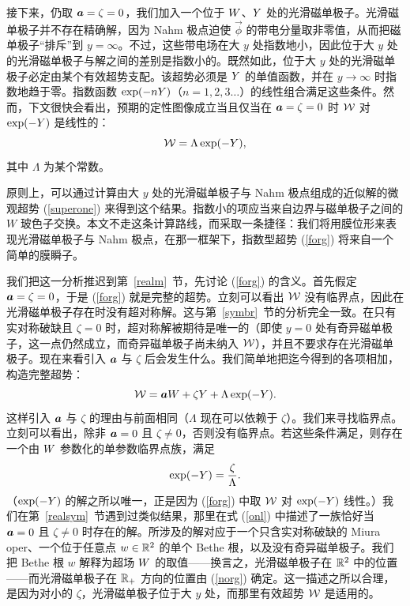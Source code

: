 
接下来，仍取 ${\boldsymbol{a}}=\zeta=0$，我们加入一个位于 ${ W}$、${ Y}$ 处的光滑磁单极子。光滑磁单极子并不存在精确解，因为 Nahm 极点迫使 $\vec\phi$ 的带电分量取非零值，从而把磁单极子“排斥”到 $y=\infty$。不过，这些带电场在大 $y$ 处指数地小，因此位于大 $y$ 处的光滑磁单极子与解之间的差别是指数小的。既然如此，位于大 $y$ 处的光滑磁单极子必定由某个有效超势支配。该超势必须是 ${ Y}$ 的单值函数，并在 $y\to\infty$ 时指数地趋于零。指数函数 $\exp(-n{ Y})$（$n=1,2,3\dots$）的线性组合满足这些条件。然而，下文很快会看出，预期的定性图像成立当且仅当在 ${\boldsymbol{a}}=\zeta=0$ 时 ${\mathcal W}$ 对 $\exp(-{ Y})$ 是线性的：
\begin{equation}\label{forg} {\mathcal W}=\Lambda \exp(-{ Y}),\end{equation}
其中 $\Lambda$ 为某个常数。


原则上，可以通过计算由大 $y$ 处的光滑磁单极子与 Nahm 极点组成的近似解的微观超势 (\ref{superone}) 来得到这个结果。指数小的项应当来自边界与磁单极子之间的 $W$ 玻色子交换。本文不走这条计算路线，而采取一条捷径：我们将用膜位形来表现光滑磁单极子与 Nahm 极点，在那一框架下，指数型超势 (\ref{forg}) 将来自一个简单的膜瞬子。

我们把这一分析推迟到第~\ref{realm}~节，先讨论 (\ref{forg}) 的含义。首先假定 ${\boldsymbol{a}}=\zeta=0$，于是 (\ref{forg}) 就是完整的超势。立刻可以看出 ${\mathcal W}$ 没有临界点，因此在光滑磁单极子存在时没有超对称解。这与第~\ref{symbr}~节的分析完全一致。在只有实对称破缺且 $\zeta=0$ 时，超对称解被期待是唯一的（即使 $y=0$ 处有奇异磁单极子，这一点仍然成立，而奇异磁单极子尚未纳入 ${\mathcal W}$），并且不要求存在光滑磁单极子。现在来看引入 ${\boldsymbol{a}}$ 与 $\zeta$ 后会发生什么。我们简单地把迄今得到的各项相加，构造完整超势：
\begin{equation}\label{morg}{\mathcal W}={\boldsymbol{a}} { W}+\zeta{ Y} +\Lambda\exp(-{ Y}).\end{equation}
这样引入 ${\boldsymbol{a}}$ 与 $\zeta$ 的理由与前面相同（$\Lambda$ 现在可以依赖于 $\zeta$）。我们来寻找临界点。立刻可以看出，除非 ${\boldsymbol{a}}=0$ 且 $\zeta\not=0$，否则没有临界点。若这些条件满足，则存在一个由 ${ W}$ 参数化的单参数临界点族，满足
\begin{equation}\label{norg} \exp(-{ Y})=\frac{\zeta}{\Lambda}.\end{equation}
（$\exp(-{ Y})$ 的解之所以唯一，正是因为 (\ref{forg}) 中取 ${\mathcal W}$ 对 $\exp(-{ Y})$ 线性。）我们在第~\ref{realsym}~节遇到过类似结果，那里在式 (\ref{onl}) 中描述了一族恰好当 ${\boldsymbol{a}}=0$ 且 $\zeta\not=0$ 时存在的解。所涉及的解对应于一个只含实对称破缺的 Miura oper、一个位于任意点 $w\in {\mathbb R}^2$ 的单个 Bethe 根，以及没有奇异磁单极子。我们把 Bethe 根 $w$ 解释为超场 ${ W}$ 的取值——换言之，光滑磁单极子在 ${\mathbb R}^2$ 中的位置——而光滑磁单极子在 ${\mathbb R}_+$ 方向的位置由 (\ref{norg}) 确定。这一描述之所以合理，是因为对小的 $\zeta$，光滑磁单极子位于大 $y$ 处，而那里有效超势 ${\mathcal W}$ 是适用的。

